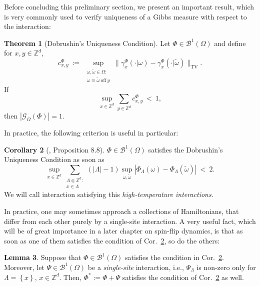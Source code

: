\documentclass[12pt]{article}
\newcommand{\BB}{\mathscr{B}}
\newcommand{\G}{\mathcal{G}}
\newcommand{\Z}{\mathbb{Z}}
\newcommand{\TV}{\mathrm{TV}}
\newcommand{\set}[1]{\left\{#1\right\}}
\newcommand{\pika}{\boldsymbol{\cdot}}
\newcommand{\1}{\mathbbm{1}}
\newcommand{\5}{\vspace{0.5cm}}
\renewcommand{\tilde}{\widetilde}
\theoremstyle{definition}
\newtheorem{thm}{Theorem}[section]
\newtheorem{lem}[thm]{Lemma}
\newtheorem{cor}[thm]{Corollary}
\begin{document}
Before concluding this preliminary section, we present an important result, which is very commonly used to verify uniqueness of a Gibbs measure with respect to the interaction:
\begin{thm}[Dobrushin's Uniqueness Condition]\label{Dobrushin}
Let $\Phi\in\BB^1(\Omega)$ and define for $x,y\in\Z^d$,
$$c_{x,y}^\Phi ~:=~ \sup_{\substack{\omega,\tilde{\omega}\in\Omega:\\\omega\equiv\tilde{\omega}~\text{off}~ y}}\|\gamma_x^\Phi(\pika|\omega)-\gamma_x^\Phi(\pika|\tilde{\omega})\|_\TV.$$
If
$$\sup_{x\in\Z^d}\sum_{y\in\Z^d}c_{x,y}^\Phi ~<~ 1,$$
then $|\G_\Omega(\Phi)|=1$.
\end{thm}

In practice, the following criterion is useful in particular:

\begin{cor}[\cite{Geo}, Proposition 8.8]\label{DobCor}
$\Phi\in\BB^1(\Omega)$ satisfies the Dobrushin's Uniqueness Condition as soon as
$$\sup_{x\in\Z^d}\sum_{\substack{\Lambda\Subset\Z^d:\\x\in\Lambda}}(|\Lambda|-1)\sup_{\omega,\tilde{\omega}}|\Phi_\Lambda(\omega)-\Phi_\Lambda(\tilde{\omega})| ~<~ 2.$$
We will call interaction satisfying this \textit{high-temperature interactions}.
\end{cor}

In practice, one may sometimes approach a collections of Hamiltonians, that differ from each other purely by a single-site interaction. A very useful fact, which will be of great importance in a later chapter on spin-flip dynamics, is that as soon as one of them satisfies the condition of Cor.~\ref{DobCor}, so do the others:
\begin{lem}\label{DobLem}
Suppose that $\Phi\in\BB^1(\Omega)$ satisfies the condition in Cor.~\ref{DobCor}. Moreover, let $\Psi\in\BB^1(\Omega)$ be a \textit{single-site} interaction, i.e., $\Psi_\Lambda$ is non-zero only for $\Lambda=\set{x}$, $x\in\Z^d$. Then, $\Phi^*:=\Phi+\Psi$ satisfies the condition of Cor.~\ref{DobCor} as well.
\end{lem}
\end{document}
